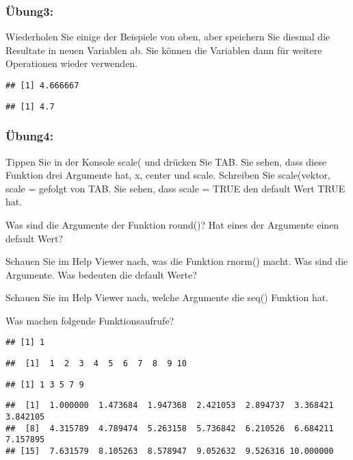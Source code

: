 \documentclass[
]{article}
\begin{document}
\hypertarget{uxfcbung3}{%
\subsubsection{Übung3:}\label{uxfcbung3}}

Wiederholen Sie einige der Beispiele von oben, aber speichern Sie
diesmal die Resultate in neuen Variablen ab. Sie können die Variablen
dann für weitere Operationen wieder verwenden.

\begin{verbatim}
## [1] 4.666667
\end{verbatim}

\begin{verbatim}
## [1] 4.7
\end{verbatim}

\hypertarget{uxfcbung4}{%
\subsubsection{Übung4:}\label{uxfcbung4}}

Tippen Sie in der Konsole scale( und drücken Sie TAB. Sie sehen, dass
diese Funktion drei Argumente hat, x, center und scale. Schreiben Sie
scale(vektor, scale = gefolgt von TAB. Sie sehen, dass scale = TRUE den
default Wert TRUE hat.

Was sind die Argumente der Funktion round()? Hat eines der Argumente
einen default Wert?

Schauen Sie im Help Viewer nach, was die Funktion rnorm() macht. Was
sind die Argumente. Was bedeuten die default Werte?

Schauen Sie im Help Viewer nach, welche Argumente die seq() Funktion
hat.

Was machen folgende Funktionsaufrufe?

\begin{verbatim}
## [1] 1
\end{verbatim}

\begin{verbatim}
##  [1]  1  2  3  4  5  6  7  8  9 10
\end{verbatim}

\begin{verbatim}
## [1] 1 3 5 7 9
\end{verbatim}

\begin{verbatim}
##  [1]  1.000000  1.473684  1.947368  2.421053  2.894737  3.368421  3.842105
##  [8]  4.315789  4.789474  5.263158  5.736842  6.210526  6.684211  7.157895
## [15]  7.631579  8.105263  8.578947  9.052632  9.526316 10.000000
\end{verbatim}
\end{document}
